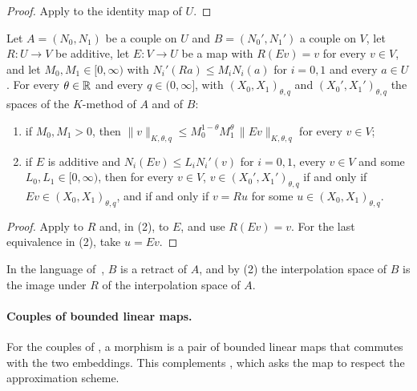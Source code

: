 \begin{proof}
\leanok
Apply  to the identity map of $U$.
\end{proof}

\begin{theorem}
\label{thm:interpolation-retracts}
\leanok
{}
Let $A = (N_0, N_1)$ be a couple on $U$ and $B = (N_0', N_1')$ a couple on $V$, let
$R : U \to V$ be additive, let $E : V \to U$ be a map with $R(Ev) = v$ for every $v \in V$, and
let $M_0, M_1 \in [0, \infty)$ with $N_i'(Ra) \leq M_i N_i(a)$ for $i = 0, 1$ and every
$a \in U$. For every $\theta \in \mathbb{R}$ and every $q \in (0, \infty]$, with
$(X_0, X_1)_{\theta, q}$ and $(X_0', X_1')_{\theta, q}$ the spaces of the $K$-method of $A$ and
of $B$:
\begin{enumerate}
  \item if $M_0, M_1 > 0$, then
    $\|v\|_{K, \theta, q} \leq M_0^{1-\theta} M_1^{\theta} \, \|Ev\|_{K, \theta, q}$ for every
    $v \in V$;
  \item if $E$ is additive and $N_i(Ev) \leq L_i N_i'(v)$ for $i = 0, 1$, every $v \in V$ and
    some $L_0, L_1 \in [0, \infty)$, then for every $v \in V$, $v \in (X_0', X_1')_{\theta, q}$
    if and only if $Ev \in (X_0, X_1)_{\theta, q}$, and if and only if $v = Ru$ for some
    $u \in (X_0, X_1)_{\theta, q}$.
\end{enumerate}
\end{theorem}

\begin{proof}
\leanok
Apply  to $R$ and, in (2), to $E$, and use $R(Ev) = v$. For
the last equivalence in (2), take $u = Ev$.
\end{proof}

In the language of~\cite[Theorem~6.4.2]{BerghLofstrom}, $B$ is a retract of $A$, and by (2) the
interpolation space of $B$ is the image under $R$ of the interpolation space of $A$.

\paragraph{Couples of bounded linear maps.}
For the couples of , a morphism is a pair of bounded linear maps that
commutes with the two embeddings. This complements , which asks
the map to respect the approximation scheme.


